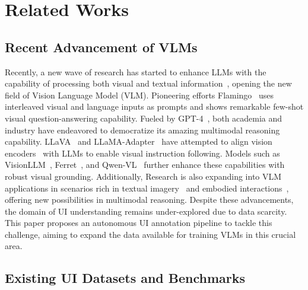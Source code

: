 \section{Related Works}

\subsection{Recent Advancement of VLMs}
Recently, a new wave of research has started to enhance LLMs with the capability of processing both visual and textual information~\citep{alayrac2022flamingo, chen2023pali,li2023otter,Lin2023VILAOP,liu2023llava,lin2023sphinx,chen2023internvl,lu2024deepseekvl,bai2023qwen,qwen2vl,zhu2024minigpt,wang2024visionllm,li2023monkey,zhang2024llamaadapter,you2024ferret,laurençon2024idefics,peng2024kosmos,driess2023palme}, opening the new field of Vision Language Model (VLM). Pioneering efforts Flamingo~\citep{alayrac2022flamingo} uses interleaved visual and language inputs as prompts and shows remarkable few-shot visual question-answering capability. Fueled by GPT-4~\citep{openai2024gpt4}, both academia and industry have endeavored to democratize its amazing multimodal reasoning capability. LLaVA~\citep{liu2023llava} and LLaMA-Adapter~\citep{zhang2024llamaadapter} have attempted to align vision encoders~\citep{dosovitskiy2021vit} with LLMs to enable visual instruction following. Models such as VisionLLM~\citep{wang2024visionllm}, Ferret~\citep{you2024ferret}, and Qwen-VL~\citep{bai2023qwen} further enhance these capabilities with robust visual grounding. Additionally, Research is also expanding into VLM applications in scenarios rich in textual imagery~\citep{Tang2022UnifyingVT,2023-ureader,ye2023mplugdocowl,liu2024textmonkey} and embodied interactions~\citep{driess2023palme, mu2023embodiedgpt}, offering new possibilities in multimodal reasoning. Despite these advancements, the domain of UI understanding remains under-explored due to data scarcity. This paper proposes an autonomous UI annotation pipeline to tackle this challenge, aiming to expand the data available for training VLMs in this crucial area.

\subsection{Existing UI Datasets and Benchmarks}

